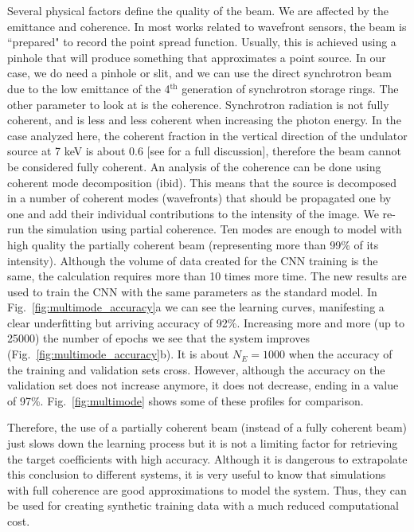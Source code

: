 \documentclass[preprint]{iucr}
\begin{document}
Several physical factors define the quality of the beam. We are affected by the emittance and coherence. In most works related to wavefront sensors, the beam is ``prepared" to record the point spread function. Usually, this is achieved using a pinhole that will produce something that approximates a point source. In our case, we do need a pinhole or slit, and we can use the direct synchrotron beam due to the low emittance of the 4$^\text{th}$ generation of synchrotron storage rings. The other parameter to look at is the coherence. Synchrotron radiation is not fully coherent, and is less and less coherent when increasing the photon energy. In the case analyzed here, the coherent fraction in the vertical direction of the undulator source at 7 keV is about 0.6 [see \cite{multioptics} for a full discussion], therefore the beam cannot be considered fully coherent. An analysis of the coherence can be done using coherent mode decomposition (ibid). This means that the source is decomposed in a number of coherent modes (wavefronts) that should be propagated one by one and add their individual contributions to the intensity of the image. We re-run the simulation using partial coherence. Ten modes are enough to model with high quality the partially coherent beam (representing more than 99\% of its intensity). Although the volume of data created for the CNN training is the same, the calculation requires more than 10 times more time. The new results are used to train the CNN with the same parameters as the standard model. In Fig.~\ref{fig:multimode_accuracy}a we can see the learning curves, manifesting a clear underfitting but arriving accuracy of 92\%. Increasing more and more (up to 25000) the number of epochs we see that the system improves (Fig.~\ref{fig:multimode_accuracy}b). It is about $N_E=1000$ when the accuracy of the training and validation sets cross. However, although the accuracy on the validation set does not increase anymore, it does not decrease, ending in a value of 97\%. Fig.~\ref{fig:multimode} shows some of these profiles for comparison.

Therefore, the use of a partially coherent beam (instead of a fully coherent beam) just slows down the learning process but it is not a limiting factor for retrieving the target coefficients with high accuracy. Although it is dangerous to extrapolate this conclusion to different systems, it is very useful to know that simulations with full coherence are good approximations to model the system. Thus, they can be used for creating synthetic training data with a much reduced computational cost. 
\end{document}
